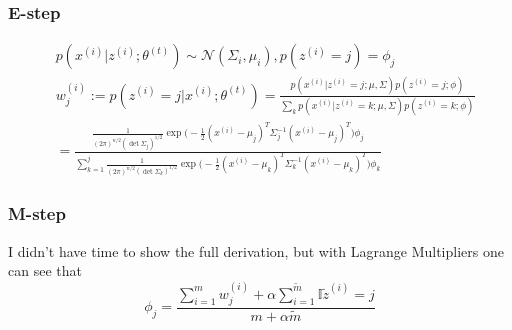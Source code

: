 \documentclass{article}
\begin{document}
\subsubsection*{E-step}
\begin{align*}
    & p(x^{(i)}|z^{(i)};\theta^{(t)})\sim\mathcal{N}(\Sigma_{i},\mu_{i}),p(z^{(i)}=j)=\phi_{j}                                                                                                                                                                                                               \\
    & w_{j}^{(i)}:=p(z^{(i)}=j|x^{(i)};\theta^{(t)})=\frac{p(x^{(i)}|z^{(i)}=j;\mu,\Sigma)p(z^{(i)}=j;\phi)}{\sum_{k}p(x^{(i)}|z^{(i)}=k;\mu,\Sigma)p(z^{(i)}=k;\phi)}                                                                                                                                       \\
    & =\frac{\frac{1}{(2\pi)^{n/2}(\det\Sigma_{j})^{1/2}}\exp\Big(-\frac{1}{2}(x^{(i)}-\mu_{j})^{T}\Sigma_{j}^{-1}(x^{(i)}-\mu_{j})^{T}\Big)\phi_{j}}{\sum_{k=1}^{j}\frac{1}{(2\pi)^{n/2}(\det\Sigma_{k})^{1/2}}\exp\Big(-\frac{1}{2}(x^{(i)}-\mu_{k})^{T}\Sigma_{k}^{-1}(x^{(i)}-\mu_{k})^{T}\Big)\phi_{k}}
\end{align*}
\subsubsection*{M-step}
I didn't have time to show the full derivation, but with Lagrange Multipliers one can see that $$\phi_{j}=\frac{\sum_{i=1}^{m}w_{j}^{(i)}+\alpha\sum_{i=1}^{\tilde{m}}\mathbb{I}{\tilde{z}^{(i)}=j}}{m+\alpha\tilde{m}}$$
\end{document}

